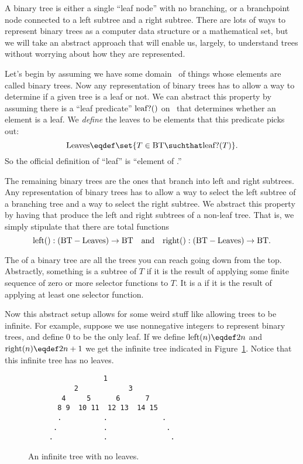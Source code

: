 A binary tree is either a single ``leaf node'' with no branching, or a
branchpoint node connected to a left subtree and a right subtree.
There are lots of ways to represent binary trees as a computer data
structure or a mathematical set, but we will take an abstract approach
that will enable us, largely, to understand trees without worrying
about how they are represented.

Let's begin by assuming we have some domain \bintree\ of things whose
elements are called binary trees.  Now any representation of binary
trees has to allow a way to determine if a given tree is a leaf or
not.  We can abstract this property by assuming there is a ``leaf
predicate'' $\text{leaf?}()$ on \bintree\ that determines whether an element
is a leaf.  We \emph{define} the leaves to be elements that this
predicate picks out:
\[
\leafset \eqdef \set{T \in \bintree \suchthat \leafp{T}}.
\]
So the official definition of ``leaf'' is ``element of \leafset.''

The remaining binary trees are the ones that branch into left and
right subtrees.  Any representation of binary trees has to allow a way
to select the left subtree of a branching tree and a way to select the
right subtree.  We abstract this property by having  that produce the left and right subtrees of a non-leaf
tree.  That is, we simply stipulate that there are total functions
\[
\text{left}(): (\text{BT} - \text{Leaves}) \to \text{BT}\quad \text{and} \quad
\text{right}(): (\text{BT} - \text{Leaves}) \to \text{BT}.
\]

The  of a binary tree are all the trees you can reach
going down from the top.  Abstractly, something is a subtree of $T$ if
it is the result of applying some finite sequence of zero or more
selector functions to $T$.  It is a  if it is the
result of applying at least one selector function.

Now this abstract setup allows for some weird stuff like allowing
trees to be infinite.  For example, suppose we use nonnegative
integers to represent binary trees, and define 0 to be the only leaf.
If we define $\leftsub{n} \eqdef 2n$ and $\rightsub{n} \eqdef 2n+1$ we
get the infinite tree indicated in Figure~\ref{inftree123}.  Notice
that this infinite tree has no leaves.

\begin{figure}


\begin{verbatim}
                  1
           2            3
        4     5      6      7
       8 9  10 11  12 13  14 15
       .          .             . 
      .           .              .
     .            .               . 

\end{verbatim}

\caption{An infinite tree with no leaves.}

\label{inftree123}

\end{figure}

